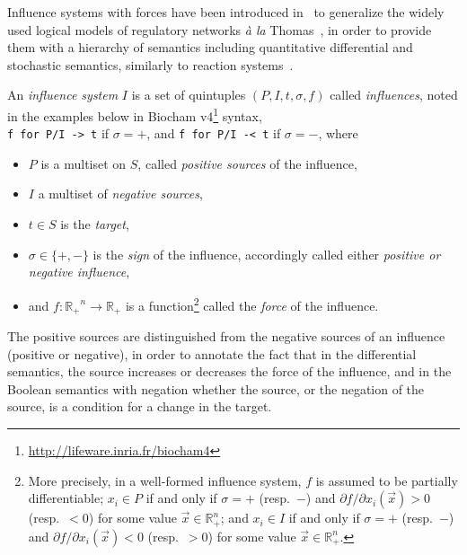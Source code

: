 \documentclass{llncs}
\begin{document}
Influence systems with forces have been introduced in~\cite{FMRS16cmsb}
to generalize the widely used logical models of regulatory networks \emph{\`a la} Thomas~\cite{Thomas73jtb},
in order to provide them with a hierarchy of semantics
including quantitative differential and stochastic semantics, similarly to reaction systems~\cite{FS08tcs}.

\begin{definition}
An \emph{influence system}
   $I$ is a set of quintuples $(P, I, t, \sigma, f)$ called \emph{influences}, noted in the examples below in Biocham v4\footnote{\url{http://lifeware.inria.fr/biocham4}} syntax,\\ \verb|f for P/I -> t| if $\sigma=+$, and \verb|f for P/I -< t| if $\sigma=-$,
   where 
\begin{itemize}
\item $P$ is a multiset on $S$, called \emph{positive sources} of the influence, 
\item $I$ a multiset of \emph{negative sources}, 
\item $t\in S$ is the \emph{target},
\item $\sigma\in\{+,-\}$ is the \emph{sign} of the influence, accordingly called either \emph{positive or negative influence},
\item and $f:\mathbb{R_+}^n\to\mathbb{R_+}$ is a function\footnote{More precisely, in a well-formed influence system, $f$ is assumed to be partially differentiable;
$x_i\in P$ if and only if $\sigma = +$ (resp.\ $-$) and
   ${\partial {f}}/ {\partial x_i}(\vec x)>0$ (resp.\ $<0$) for some value
   $\vec x\in\mathbb{R}_+^n$;
 and $x_i\in I$ if and only if $\sigma = +$ (resp.\ $-$) and
   ${\partial {f}}/ {\partial x_i}(\vec x)<0$ (resp.\ $>0$) for some value
  $\vec x\in\mathbb{R}_+^n$.}
called the \emph{force} of the influence.
\end{itemize}
\end{definition}

The positive sources are distinguished from the negative sources of an influence (positive or negative),
in order to annotate the fact that in the differential semantics,
the source increases or decreases the force of the influence,
and in the Boolean semantics with negation whether the source, or the negation of the source,
is a condition for a change in the target.
\end{document}
